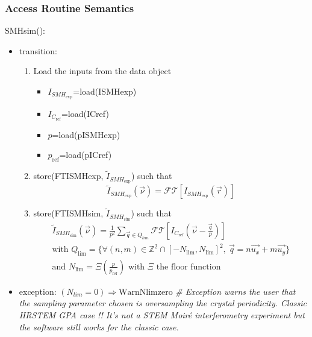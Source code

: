 \documentclass[12pt, titlepage]{article}
\begin{document}
\subsubsection{Access Routine Semantics}

\noindent SMHsim():
\begin{itemize} 
\item transition:
	\begin{enumerate}
	\item Load the inputs from the data object
	\begin{itemize}
	\item $I_{\mathit{SMH}_{\text{exp}}}$=load(ISMHexp)
	\item $I_{C_{\text{ref}}}$=load(ICref)
	\item $p$=load(pISMHexp)
	\item $p_{\text{ref}}$=load(pICref)
	\end{itemize}
	\item store(FTISMHexp, $\widetilde{I}_{\mathit{SMH}_{\text{exp}}}$) such that
	\begin{equation*}
\widetilde{I}_{\mathit{SMH}_{\text{exp}}}(\vec{\nu})=\mathcal{FT}[I_{\mathit{SMH}_{\text{exp}}}(\vec{r})]
	\end{equation*}
	\item store(FTISMHsim, $\widetilde{I}_{\mathit{SMH}_{\text{sim}}}$) such that
	\begin{equation*}
	\begin{gathered}
\widetilde{I}_{\mathit{SMH}_{\text{sim}}}(\vec{\nu})=\frac{1}{p^2}\sum_{\vec{q}\in 
Q_{lim}}\mathcal{FT}[I_{C_{\text{ref}}}(\vec{\nu}-\frac{\vec{q}}{p})] \\
	\text{with } Q_{\text{lim}}=\{\forall (n,m) \in 
\mathbb{Z}^{2}\cap[-N_{\text{lim}},N_{\text{lim}}]^2, \ 
\vec{q}=n\vec{u_x}+m\vec{u_y}\} \\
	\text{and } N_{\text{lim}}=\Xi(\frac{p}{p_{\text{ref}}}) \text{ with } \Xi 
\text{ the floor function } 
	\end{gathered}
	\end{equation*}
	\end{enumerate}

\item exception:
\newline
$(N_{lim}=0) \Rightarrow \text{WarnNlimzero}$
\textit{{\#} Exception warns the user that the sampling parameter chosen is 
oversampling the crystal periodicity. Classic HRSTEM GPA case !! It's not a STEM 
Moir{\'e} interferometry experiment but the software still works for the classic 
case.}

\end{itemize}
\end{document}

